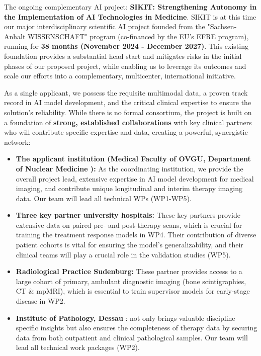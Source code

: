 \documentclass[11pt, a4paper]{article}
\begin{document}
The ongoing complementary AI project: \textbf{SIKIT: Strengthening Autonomy in the Implementation of AI Technologies in Medicine}. SIKIT is at this time our major interdisciplinary scientific AI project founded from the "Sachsen-Anhalt WISSENSCHAFT" program (co-financed by the EU's EFRE program), running for \textbf{38 months (November 2024 - December 2027)}. This existing foundation provides a substantial head start and mitigates risks in the initial phases of our proposed project, while enabling us to leverage its outcomes  and scale our efforts into a complementary, multicenter, international initiative.

As a single applicant, we possess the requisite multimodal data, a proven track record in AI model development, and the critical clinical expertise to ensure the solution's reliability. While there is no formal consortium, the project is built on a foundation of \textbf{strong, established collaborations} with key clinical partners who will contribute specific expertise and data, creating a powerful, synergistic network:
\begin{itemize}
    \item \textbf{The applicant institution (Medical Faculty of OVGU, Department of Nuclear Medicine ):} As the coordinating institution, we provide the overall project lead, extensive expertise in AI model development for medical imaging, and contribute unique longitudinal and interim therapy imaging data. Our team will lead all technical WPs (WP1-WP5).
    \item \textbf{Three key partner university hospitals:} These key partners provide extensive data on paired pre- and post-therapy scans, which is crucial for training the treatment response models in WP4. Their contribution of diverse patient cohorts is vital for ensuring the model's generalizability, and their clinical teams will play a crucial role in the validation studies (WP5).
    \item \textbf{Radiological Practice Sudenburg:} These partner provides access to a large cohort of primary, ambulant diagnostic imaging (bone scintigraphies, CT \& mpMRI), which is essential to train supervisor models for early-stage disease in WP2.
    \item \textbf{Institute of Pathology, Dessau} : not only brings valuable discipline specific insights but also ensures the completeness of therapy data by securing data from both outpatient and clinical pathological samples. Our team will lead all technical work packages (WP2).  
\end{itemize}
\end{document}

